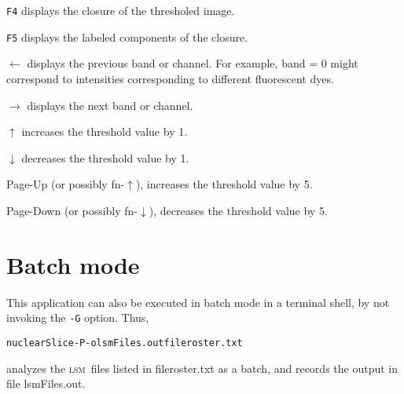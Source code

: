 \documentclass[10pt]{article}
\newcommand{\LSM}{\textsc{lsm}}
\begin{document}
\begin{description}
\item{\tt F4} displays the closure of the thresholed image.
\item{\tt F5} displays the labeled components of the closure.
\item{$\leftarrow$} displays the previous band or channel. For example, band = 0 might correspond to
intensities corresponding to different fluorescent dyes.
\item{$\rightarrow$} displays the next band or channel.
\item{$\uparrow$} increases the threshold value by 1.
\item{$\downarrow$} decreases the threshold value by 1.
\item{Page-Up} (or possibly fn-$\uparrow$), increases the threshold value by 5.
\item{Page-Down} (or possibly fn-$\downarrow$), decreases the threshold value by 5.
\end{description} 

\section{Batch mode}

This application can also be executed in batch mode in a terminal shell, by not invoking the \texttt{-G}
option. Thus,
\begin{alltt}
nuclearSlice -P -o lsmFiles.out  fileroster.txt
\end{alltt}
analyzes the \LSM\ files listed in fileroster.txt as a batch, and records the output in file lsmFiles.out.
\end{document}
